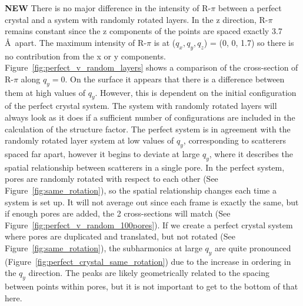 \documentclass{article}
\begin{document}
  \textbf{NEW} There is no major difference in the intensity of R-$\pi$ between
  a perfect crystal and a system with randomly rotated layers. In the z
  direction, R-$\pi$ remains constant since the z components of the points are
  spaced exactly 3.7 \AA~apart. The maximum intensity of R-$\pi$ is at ($q_x,
  q_y, q_z$) = (0, 0, 1.7) so there is no contribution from the x or y
  components. Figure~\ref{fig:perfect_v_random_layers} shows a comparison of the
  cross-section of R-$\pi$ along $q_y=0$. On the surface it appears that there is
  a difference between them at high values of $q_y$. However, this is dependent
  on the initial configuration of the perfect crystal system. The system with
  randomly rotated layers will always look as it does if a sufficient number of
  configurations are included in the calculation of the structure factor. The
  perfect system is in agreement with the randomly rotated layer system at low
  values of $q_y$, corresponding to scatterers spaced far apart, however it begins
  to deviate at large $q_y$, where it describes the spatial relationship between
  scatterers in a single pore. In the perfect system, pores are randomly rotated
  with respect to each other (See Figure~\ref{fig:same_rotation}), so the spatial
  relationship changes each time a system is set up. It will not average out since
  each frame is exactly the same, but if enough pores are added, the 2 
  cross-sections will match (See Figure~\ref{fig:perfect_v_random_100pores}). 
  If we create a perfect crystal system where pores are duplicated and translated, but
  not rotated (See Figure~\ref{fig:same_rotation}), the subharmonics
  at large $q_y$ are quite pronounced (Figure~\ref{fig:perfect_crystal_same_rotation})
  due to the increase in ordering in the $q_y$ direction. The peaks are likely
  geometrically related to the spacing between points within pores, but it is 
  not important to get to the bottom of that here.
\end{document}
